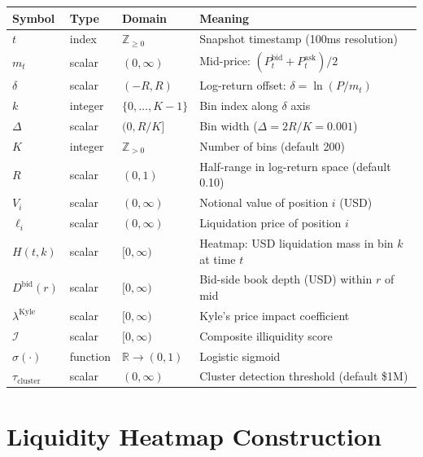 \documentclass[11pt,a4paper]{article}
\begin{document}
\begin{center}
\begin{tabular}{llll}
\toprule
\textbf{Symbol} & \textbf{Type} & \textbf{Domain} & \textbf{Meaning} \\
\midrule
$t$ & index & $\mathbb{Z}_{\geq 0}$ & Snapshot timestamp (100ms resolution) \\
$m_t$ & scalar & $(0, \infty)$ & Mid-price: $(P^{\text{bid}}_t + P^{\text{ask}}_t)/2$ \\
$\delta$ & scalar & $(-R, R)$ & Log-return offset: $\delta = \ln(P / m_t)$ \\
$k$ & integer & $\{0, \ldots, K{-}1\}$ & Bin index along $\delta$ axis \\
$\Delta$ & scalar & $(0, R/K]$ & Bin width ($\Delta = 2R/K = 0.001$) \\
$K$ & integer & $\mathbb{Z}_{>0}$ & Number of bins (default 200) \\
$R$ & scalar & $(0, 1)$ & Half-range in log-return space (default 0.10) \\
$V_i$ & scalar & $(0, \infty)$ & Notional value of position $i$ (USD) \\
$\ell_i$ & scalar & $(0, \infty)$ & Liquidation price of position $i$ \\
$H(t, k)$ & scalar & $[0, \infty)$ & Heatmap: USD liquidation mass in bin $k$ at time $t$ \\
$D^{\text{bid}}(r)$ & scalar & $[0, \infty)$ & Bid-side book depth (USD) within $r$ of mid \\
$\lambda^{\text{Kyle}}$ & scalar & $[0, \infty)$ & Kyle's price impact coefficient \\
$\mathcal{I}$ & scalar & $[0, \infty)$ & Composite illiquidity score \\
$\sigma(\cdot)$ & function & $\mathbb{R} \to (0,1)$ & Logistic sigmoid \\
$\tau_{\text{cluster}}$ & scalar & $(0, \infty)$ & Cluster detection threshold (default \$1M) \\
\bottomrule
\end{tabular}
\end{center}

\section{Liquidity Heatmap Construction}
\label{sec:heatmap}
\end{document}
